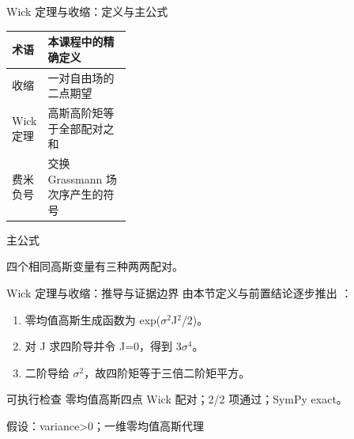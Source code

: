 \begin{frame}[t]{Wick 定理与收缩：定义与主公式}
\footnotesize\begin{tabularx}{\linewidth}{p{0.30\linewidth}Y}
\toprule 术语 & 本课程中的精确定义\\\midrule
{} 收缩 & 一对自由场的二点期望\\
 Wick 定理 & 高斯高阶矩等于全部配对之和\\
 费米负号 & 交换 Grassmann 场次序产生的符号\\
\bottomrule\end{tabularx}\vspace{0.15cm}
\begin{block}{ 主公式}\centering{}\end{block}
四个相同高斯变量有三种两两配对。
\end{frame}

\begin{frame}[t]{Wick 定理与收缩：推导与证据边界}
\footnotesize
{}\quad 由本节定义与前置结论逐步推出 ：
\begin{enumerate}
\item 零均值高斯生成函数为 exp(\ensuremath{\sigma}\ensuremath{^{2}}J\ensuremath{^{2}}/\allowbreak{}2)。
\item 对 J 求四阶导并令 J=0，得到 3\ensuremath{\sigma}\ensuremath{^{4}}。
\item 二阶导给 \ensuremath{\sigma}\ensuremath{^{2}}，故四阶矩等于三倍二阶矩平方。
\end{enumerate}\begin{block}{可执行检查}
\quad 零均值高斯四点 Wick 配对；2/2 项通过；SymPy exact。
\par\scriptsize 假设：variance>0；一维零均值高斯代理
\end{block}
\end{frame}

